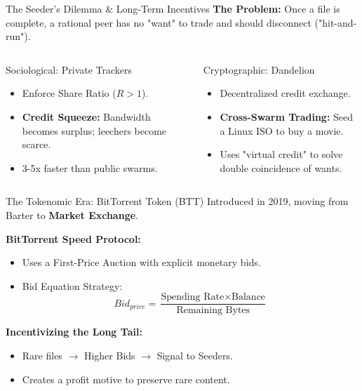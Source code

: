 \documentclass[aspectratio=169]{beamer}
\begin{document}
\begin{frame}{The Seeder's Dilemma \& Long-Term Incentives}
    \textbf{The Problem:} Once a file is complete, a rational peer has no "want" to trade and should disconnect ("hit-and-run").
    
    \vspace{0.5cm}
    \begin{columns}
        \begin{block}{Sociological: Private Trackers}
            \begin{itemize}
                \item Enforce Share Ratio ($R > 1$).
                \item \textbf{Credit Squeeze:} Bandwidth becomes surplus; leechers become scarce.
                \item 3-5x faster than public swarms.
            \end{itemize}
        \end{block}

        \begin{block}{Cryptographic: Dandelion}
            \begin{itemize}
                \item Decentralized credit exchange.
                \item \textbf{Cross-Swarm Trading:} Seed a Linux ISO to buy a movie.
                \item Uses "virtual credit" to solve double coincidence of wants.
            \end{itemize}
        \end{block}
    \end{columns}
\end{frame}

\begin{frame}{The Tokenomic Era: BitTorrent Token (BTT)}
    Introduced in 2019, moving from Barter to \textbf{Market Exchange}.
    
    \textbf{BitTorrent Speed Protocol:}
    \begin{itemize}
        \item Uses a First-Price Auction with explicit monetary bids.
        \item Bid Equation Strategy:
        \begin{equation}
            Bid_{price} = \frac{\text{Spending Rate} \times \text{Balance}}{\text{Remaining Bytes}}
        \end{equation}
    \end{itemize}

    \textbf{Incentivizing the Long Tail:}
    \begin{itemize}
        \item Rare files $\rightarrow$ Higher Bids $\rightarrow$ Signal to Seeders.
        \item Creates a profit motive to preserve rare content.
    \end{itemize}
\end{frame}
\end{document}
